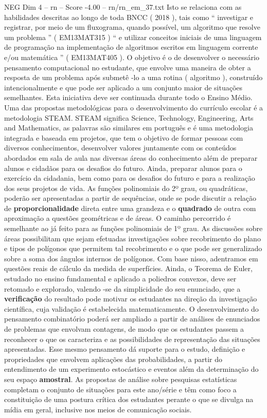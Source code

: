 \begin{textsample}{NEG Dim 4 – rn – Score -4.00 – rn/rn\_em\_37.txt}
Isto se relaciona com as habilidades descritas ao longo de toda BNCC ( 2018 ), tais como “ investigar e registrar, por meio de um fluxograma, quando possível, um algoritmo que resolve um problema ” ( EM13MAT315 ) “ e utilizar conceitos iniciais de uma linguagem de programação na implementação de algoritmos escritos em linguagem corrente e/ou matemática ” ( EM13MAT405 ).
O objetivo é o de desenvolver o necessário pensamento computacional no estudante, que envolve uma maneira de obter a resposta de um problema após submetê -lo a uma rotina ( algoritmo ), construído intencionalmente e que pode ser aplicado a um conjunto maior de situações semelhantes.
Esta iniciativa deve ser continuada durante todo o Ensino Médio.
Uma das propostas metodológicas para o desenvolvimento do currículo escolar é a metodologia STEAM.
STEAM significa Science, Technology, Engineering, Arts and Mathematics, as palavras são similares em português e é uma metodologia integrada e baseada em projetos, que tem o objetivo de formar pessoas com diversos conhecimentos, desenvolver valores juntamente com os conteúdos abordados em sala de aula nas diversas áreas do conhecimento além de preparar alunos e cidadãos para os desafios do futuro.
Ainda, preparar alunos para o exercício da cidadania, bem como para os desafios do futuro e para a realização dos seus projetos de vida.
As funções polinomiais do 2º grau, ou quadráticas, poderão ser apresentadas a partir de sequências, onde se pode discutir a relação de \textbf{proporcionalidade} direta entre uma grandeza e o \textbf{quadrado} de outra com aproximação a questões geométricas e de áreas.
O caminho percorrido é semelhante ao já feito para as funções polinomiais de 1º grau.
As discussões sobre áreas possibilitam que sejam efetuadas investigações sobre recobrimento do plano e tipos de polígonos que permitem tal recobrimento e o que pode ser generalizado sobre a soma dos ângulos internos de polígonos.
Com base nisso, adentramos em questões reais de cálculo da medida de superfícies.
Ainda, o Teorema de Euler, estudado no ensino fundamental e aplicado a poliedros convexos, deve ser retomado e explorado, valendo -se da simplicidade do seu enunciado, que a \textbf{verificação} do resultado pode motivar os estudantes na direção da investigação científica, cuja validação é estabelecida matematicamente.
O desenvolvimento do pensamento combinatório poderá ser ampliado a partir de análises de enunciados de problemas que envolvam contagens, de modo que os estudantes passem a reconhecer o que os caracteriza e as possibilidades de representação das situações apresentadas.
Esse mesmo pensamento dá suporte para o estudo, definição e propriedades que envolvem aplicações das probabilidades, a partir do entendimento de um experimento estocástico e eventos além da determinação do seu espaço \textbf{amostral}.
As propostas de análise sobre pesquisas estatísticas completam o conjunto de situações para este ano/série e têm como foco a constituição de uma postura crítica dos estudantes perante o que se divulga na mídia em geral, inclusive nos meios de comunicação sociais.

\end{textsample}
